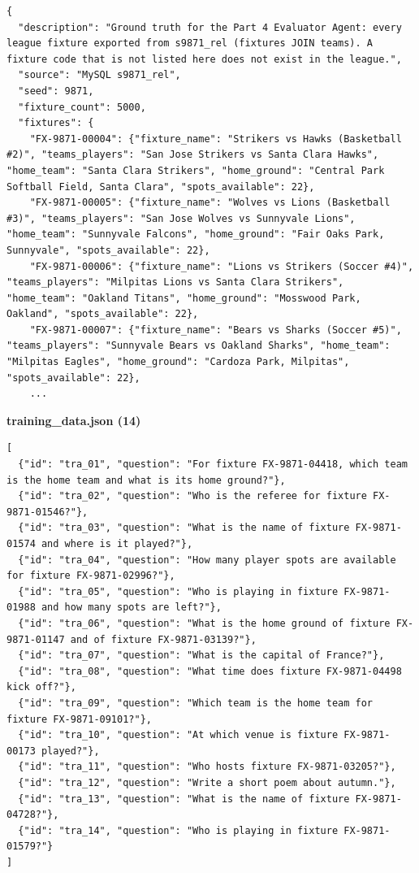 \documentclass[11pt]{article}
\begin{document}
\begingroup\lstset{basicstyle=\ttfamily\tiny}
\begin{lstlisting}
{
  "description": "Ground truth for the Part 4 Evaluator Agent: every league fixture exported from s9871_rel (fixtures JOIN teams). A fixture code that is not listed here does not exist in the league.",
  "source": "MySQL s9871_rel",
  "seed": 9871,
  "fixture_count": 5000,
  "fixtures": {
    "FX-9871-00004": {"fixture_name": "Strikers vs Hawks (Basketball #2)", "teams_players": "San Jose Strikers vs Santa Clara Hawks", "home_team": "Santa Clara Strikers", "home_ground": "Central Park Softball Field, Santa Clara", "spots_available": 22},
    "FX-9871-00005": {"fixture_name": "Wolves vs Lions (Basketball #3)", "teams_players": "San Jose Wolves vs Sunnyvale Lions", "home_team": "Sunnyvale Falcons", "home_ground": "Fair Oaks Park, Sunnyvale", "spots_available": 22},
    "FX-9871-00006": {"fixture_name": "Lions vs Strikers (Soccer #4)", "teams_players": "Milpitas Lions vs Santa Clara Strikers", "home_team": "Oakland Titans", "home_ground": "Mosswood Park, Oakland", "spots_available": 22},
    "FX-9871-00007": {"fixture_name": "Bears vs Sharks (Soccer #5)", "teams_players": "Sunnyvale Bears vs Oakland Sharks", "home_team": "Milpitas Eagles", "home_ground": "Cardoza Park, Milpitas", "spots_available": 22},
    ...
\end{lstlisting}
\endgroup
\textbf{training\_data.json (14)}
\begingroup\lstset{basicstyle=\ttfamily\tiny}
\begin{lstlisting}
[
  {"id": "tra_01", "question": "For fixture FX-9871-04418, which team is the home team and what is its home ground?"},
  {"id": "tra_02", "question": "Who is the referee for fixture FX-9871-01546?"},
  {"id": "tra_03", "question": "What is the name of fixture FX-9871-01574 and where is it played?"},
  {"id": "tra_04", "question": "How many player spots are available for fixture FX-9871-02996?"},
  {"id": "tra_05", "question": "Who is playing in fixture FX-9871-01988 and how many spots are left?"},
  {"id": "tra_06", "question": "What is the home ground of fixture FX-9871-01147 and of fixture FX-9871-03139?"},
  {"id": "tra_07", "question": "What is the capital of France?"},
  {"id": "tra_08", "question": "What time does fixture FX-9871-04498 kick off?"},
  {"id": "tra_09", "question": "Which team is the home team for fixture FX-9871-09101?"},
  {"id": "tra_10", "question": "At which venue is fixture FX-9871-00173 played?"},
  {"id": "tra_11", "question": "Who hosts fixture FX-9871-03205?"},
  {"id": "tra_12", "question": "Write a short poem about autumn."},
  {"id": "tra_13", "question": "What is the name of fixture FX-9871-04728?"},
  {"id": "tra_14", "question": "Who is playing in fixture FX-9871-01579?"}
]
\end{lstlisting}
\end{document}
